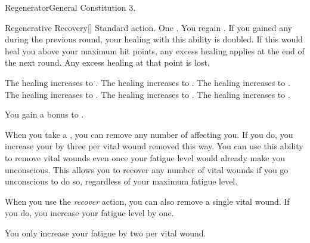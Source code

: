   \begin{feat}{Regenerator}{General}
    \featpre Constitution 3.

    \begin{activeability}{Regenerative Recovery}[]
      \abilityusagetime Standard action.
      \abilitycost One .
      \rankline
      You regain \damagerankthreelow {}.
      If you gained any  during the previous round, your healing with this ability is doubled.
      If this would heal you above your maximum hit points, any excess healing applies at the end of the next round.
      Any excess healing at that point is lost.

      \rankline
       The healing increases to \damagerankfourlow.
       The healing increases to \damagerankfivelow.
       The healing increases to \damageranksixlow.
       The healing increases to \damageranksevenlow.
       The healing increases to \damagerankeightlow.
       The healing increases to \damagerankninelow.
    \end{activeability}

     You gain a  bonus to .

     When you take a , you can remove any number of  affecting you.
    If you do, you increase your  by three per vital wound removed this way.
    You can use this ability to remove vital wounds even once your fatigue level would already make you unconscious.
    This allows you to recover any number of vital wounds if you go unconscious to do so, regardless of your maximum fatigue level.

     When you use the \textit{recover} action, you can also remove a single vital wound.
    If you do, you increase your fatigue level by one.

     You only increase your fatigue by two per vital wound.
  \end{feat}

